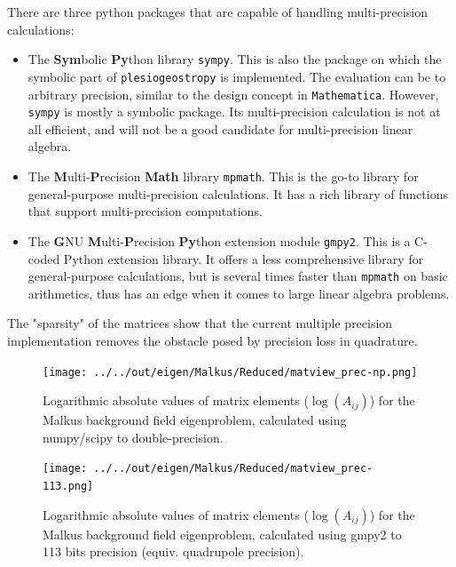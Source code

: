 There are three python packages that are capable of handling multi-precision calculations:
\begin{itemize}
    \item The \textbf{Sym}bolic \textbf{Py}thon library \colorbox{backcolour}{\lstinline|sympy|}. This is also the package on which the symbolic part of \colorbox{backcolour}{\lstinline|plesiogeostropy|} is implemented. The evaluation can be to arbitrary precision, similar to the design concept in \texttt{Mathematica}. However, \colorbox{backcolour}{\lstinline|sympy|} is mostly a symbolic package. Its multi-precision calculation is not at all efficient, and will not be a good candidate for multi-precision linear algebra.
    \item The \textbf{M}ulti-\textbf{P}recision \textbf{Math} library \colorbox{backcolour}{\lstinline|mpmath|}. This is the go-to library for general-purpose multi-precision calculations. It has a rich library of functions that support multi-precision computations.
    \item The \textbf{G}NU \textbf{M}ulti-\textbf{P}recision \textbf{Py}thon extension module \colorbox{backcolour}{\lstinline|gmpy2|}. This is a C-coded Python extension library. It offers a less comprehensive library for general-purpose calculations, but is several times faster than \colorbox{backcolour}{\lstinline|mpmath|} on basic arithmetics, thus has an edge when it comes to large linear algebra problems.
\end{itemize}

\noindent {}

\noindent {}

\noindent {}

The "sparsity" of the matrices show that the current multiple precision implementation removes the obstacle posed by precision loss in quadrature.

\begin{figure}[htbp]
    \centering
    \texttt{[image: ../../out/eigen/Malkus/Reduced/matview\_prec-np.png]}
    \caption{Logarithmic absolute values of matrix elements ($\log(A_{ij})$) for the Malkus background field eigenproblem, calculated using numpy/scipy to double-precision.}
\end{figure}

\begin{figure}[htbp]
    \centering
    \texttt{[image: ../../out/eigen/Malkus/Reduced/matview\_prec-113.png]}
    \caption{Logarithmic absolute values of matrix elements ($\log(A_{ij})$) for the Malkus background field eigenproblem, calculated using gmpy2 to 113 bits precision (equiv. quadrupole precision).}
\end{figure}


